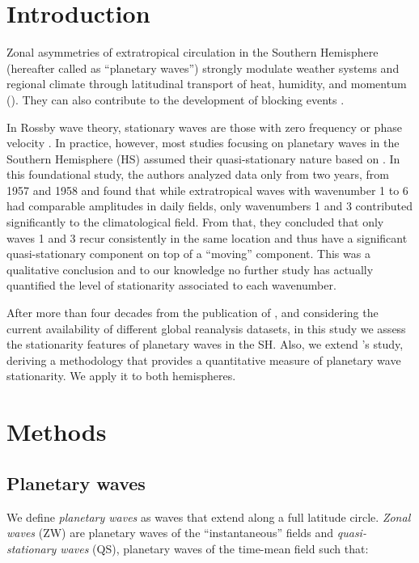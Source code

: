 \documentclass[draft,linenumbers]{agujournal2018}
\begin{document}
\section{Introduction}

Zonal asymmetries of extratropical circulation in the Southern
Hemisphere (hereafter called as ``planetary waves'') strongly modulate
weather systems and regional climate through latitudinal transport of
heat, humidity, and momentum (\citet{trenberth1980a}). They can also
contribute to the development of blocking events
\citep[e.g.~][]{trenberth1985}.

In Rossby wave theory, stationary waves are those with zero frequency or
phase velocity \citep{holton2012}. In practice, however, most studies
focusing on planetary waves in the Southern Hemisphere (HS) assumed
their quasi-stationary nature based on \citet{vanloon1972}. In this
foundational study, the authors analyzed data only from two years, from
1957 and 1958 and found that while extratropical waves with wavenumber 1
to 6 had comparable amplitudes in daily fields, only wavenumbers 1 and 3
contributed significantly to the climatological field. From that, they
concluded that only waves 1 and 3 recur consistently in the same
location and thus have a significant quasi-stationary component on top
of a ``moving'' component. This was a qualitative conclusion and to our
knowledge no further study has actually quantified the level of
stationarity associated to each wavenumber.

After more than four decades from the publication of
\citet{vanloon1972}, and considering the current availability of
different global reanalysis datasets, in this study we assess the
stationarity features of planetary waves in the SH. Also, we extend
\citet{vanloon1972}'s study, deriving a methodology that provides a
quantitative measure of planetary wave stationarity. We apply it to both
hemispheres.

\section{Methods}

\subsection{Planetary waves}

We define \emph{planetary waves} as waves that extend along a full
latitude circle. \emph{Zonal waves} (ZW) are planetary waves of the
``instantaneous'' fields and \emph{quasi-stationary waves} (QS),
planetary waves of the time-mean field such that:
\end{document}
